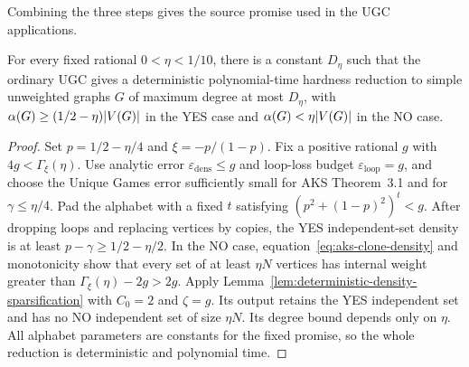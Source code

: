 Combining the three steps gives the source promise used in the
\textup{UGC} applications.

\begin{theorem}
\label{thm:bounded-degree-kr-source}
For every fixed rational $0<\eta<1/10$, there is a constant
$D_\eta$ such that the ordinary \textup{UGC} gives a deterministic
polynomial-time hardness reduction to simple unweighted graphs
$G$ of maximum degree at most $D_\eta$, with
$\alpha(G)\ge(1/2-\eta)|V(G)|$ in the YES case and
$\alpha(G)<\eta|V(G)|$ in the NO case.
\end{theorem}

\begin{proof}
Set $p=1/2-\eta/4$ and $\xi=-p/(1-p)$. Fix a positive rational
$g$ with $4g<\Gamma_\xi(\eta)$. Use analytic error
$\varepsilon_{\mathrm{dens}}\le g$ and loop-loss budget
$\varepsilon_{\mathrm{loop}}=g$, and choose the Unique Games error sufficiently
small for AKS Theorem~3.1 and for $\gamma\le\eta/4$.
Pad the alphabet with a fixed $t$ satisfying
$(p^2+(1-p)^2)^t<g$. After dropping loops and replacing vertices by
copies, the YES independent-set density is at least
$p-\gamma\ge1/2-\eta/2$. In the NO case,
equation~\eqref{eq:aks-clone-density} and monotonicity show that
every set of at least $\eta N$ vertices has internal weight
greater than $\Gamma_\xi(\eta)-2g>2g$.
Apply Lemma~\ref{lem:deterministic-density-sparsification} with
$C_0=2$ and $\zeta=g$. Its output retains the YES
independent set and has no NO independent set of size $\eta N$.
Its degree bound depends only on $\eta$.
All alphabet parameters are constants for the fixed promise, so
the whole reduction is deterministic and polynomial time.
\end{proof}




